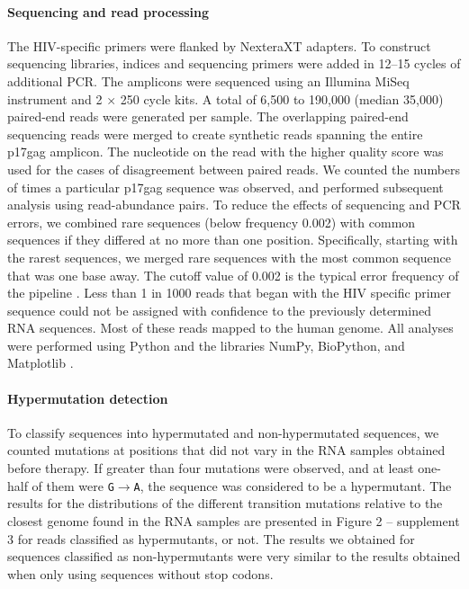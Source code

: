 \documentclass[aps,rmp,onecolumn,linenumbers]{revtex4-1}
\begin{document}
\paragraph*{Sequencing and read processing}
The HIV-specific primers were flanked by NexteraXT adapters. To construct sequencing libraries, indices and sequencing primers were added in 12--15 cycles of additional PCR. 
The amplicons were sequenced using an Illumina MiSeq instrument and 2 × 250 cycle kits. A total of 6,500 to 190,000 (median 35,000) paired-end reads were generated per sample. The overlapping paired-end sequencing reads were merged to create synthetic reads spanning the entire p17gag amplicon. The nucleotide on the read with the higher quality score was used for the cases of disagreement between paired reads. We counted the numbers of times a particular p17gag sequence was observed, and performed subsequent analysis using read-abundance pairs.
To reduce the effects of sequencing and PCR errors, we combined rare sequences (below frequency 0.002) with common sequences if they differed at no more than one position. Specifically, starting with the rarest sequences, we merged rare sequences with the most common sequence that was one base away. The cutoff value of 0.002 is the typical error frequency of the pipeline \cite{zanini_population_2016}. 
Less than 1 in 1000 reads that began with the HIV specific primer sequence could not be assigned with confidence to the previously determined RNA sequences. Most of these reads mapped to the human genome.
All analyses were performed using Python and the libraries NumPy, BioPython, and Matplotlib \cite{cock_biopython:_2009,van_der_walt_numpy_2011,hunter_matplotlib:_2007}.

\paragraph*{Hypermutation detection}
To classify sequences into hypermutated and non-hypermutated sequences, we counted mutations at positions that did not vary in the RNA samples obtained before therapy. If greater than four mutations were observed, and at least one-half of them were \texttt{G}$\to$\texttt{A}, the sequence was considered to be a hypermutant. The results for the distributions of the different transition mutations relative to the closest genome found in the RNA samples are presented in Figure 2 – supplement 3 for reads classified as hypermutants, or not. The results we obtained for sequences classified as non-hypermutants were very similar to the results obtained when only using sequences without stop codons.
\end{document}
